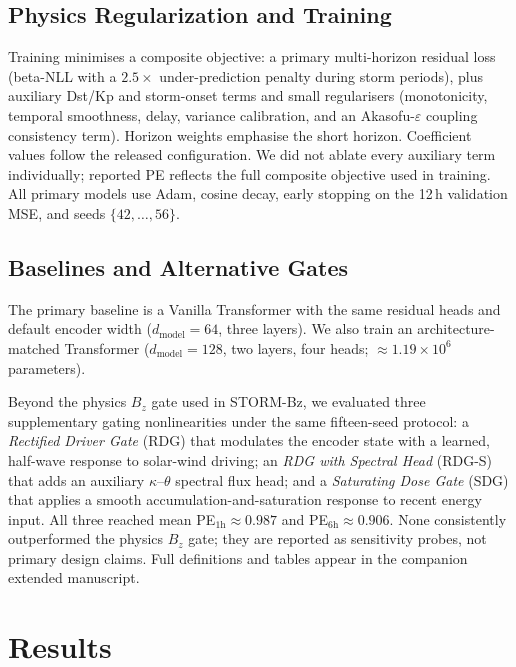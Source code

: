 \documentclass[conference]{IEEEtran}
\begin{document}
\subsection{Physics Regularization and Training}
Training minimises a composite objective: a primary multi-horizon residual loss (beta-NLL with a \(2.5\times\) under-prediction penalty during storm periods), plus auxiliary Dst/Kp and storm-onset terms and small regularisers (monotonicity, temporal smoothness, delay, variance calibration, and an Akasofu-\(\varepsilon\) coupling consistency term). Horizon weights emphasise the short horizon. Coefficient values follow the released configuration. We did not ablate every auxiliary term individually; reported PE reflects the full composite objective used in training. All primary models use Adam, cosine decay, early stopping on the 12\,h validation MSE, and seeds \(\{42,\ldots,56\}\).

\subsection{Baselines and Alternative Gates}
The primary baseline is a Vanilla Transformer with the same residual heads
and default encoder width ($d_{\mathrm{model}}=64$, three layers). We also
train an architecture-matched Transformer ($d_{\mathrm{model}}=128$, two
layers, four heads; $\approx1.19\times10^{6}$ parameters).

Beyond the physics $B_z$ gate used in STORM-Bz, we evaluated three
supplementary gating nonlinearities under the same fifteen-seed protocol:
a \emph{Rectified Driver Gate} (RDG) that modulates the encoder state with a
learned, half-wave response to solar-wind driving; an \emph{RDG with Spectral
Head} (RDG-S) that adds an auxiliary $\kappa$--$\theta$ spectral flux head;
and a \emph{Saturating Dose Gate} (SDG) that applies a smooth
accumulation-and-saturation response to recent energy input. All three reached
mean PE$_{1\mathrm{h}}\approx0.987$ and PE$_{6\mathrm{h}}\approx0.906$.
None consistently outperformed the physics $B_z$ gate; they are reported as
sensitivity probes, not primary design claims. Full definitions and tables
appear in the companion extended manuscript.

\section{Results}
\label{sec:results}
\end{document}
